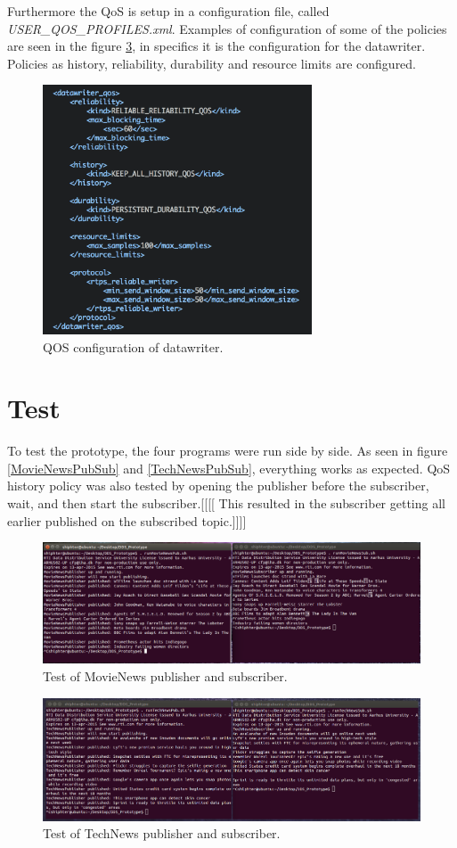 Furthermore the QoS is setup in a configuration file, called \emph{USER\_QOS\_PROFILES.xml}. Examples of configuration of some of the policies are seen in the figure \ref{QOSProfiles}, in specifics it is the configuration for the datawriter. Policies as history, reliability, durability and resource limits are configured.

\begin{figure}[ht!]
\centering
\includegraphics[width=80mm]{img/QOSProfiles.png}
\caption{QOS configuration of datawriter.}
\label{QOSProfiles}
\end{figure}

\section{Test}
To test the prototype, the four programs were run side by side. As seen in figure \ref{MovieNewsPubSub} and \ref{TechNewsPubSub}, everything works as expected. QoS history policy was also tested by opening the publisher before the subscriber, wait, and then start the subscriber.[[[[ This resulted in the subscriber getting all earlier published on the subscribed topic.]]]]

\begin{figure}[ht!]
\centering
\includegraphics[width=150mm]{img/MovieNewsPubSub.png}
\caption{Test of MovieNews publisher and subscriber.}
\label{QOSProfiles}
\end{figure}

\begin{figure}[ht!]
\centering
\includegraphics[width=150mm]{img/TechNewsPubSub.png}
\caption{Test of TechNews publisher and subscriber.}
\label{QOSProfiles}
\end{figure}
